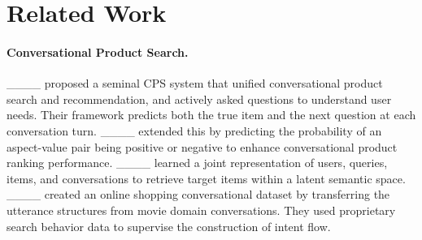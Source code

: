 \section{Related Work}
\label{sec:related_work}

\vspace{-0.5em}
\paragraph{Conversational Product Search.}

____ proposed a seminal CPS system that unified conversational product search and recommendation, and actively asked questions to understand user needs. 
Their framework predicts both the true item and the next question at each conversation turn. 
____ extended this by predicting the probability of an aspect-value pair being positive or negative to enhance conversational product ranking performance. 
____ learned a joint representation of users, queries, items, and conversations to retrieve target items within a latent semantic space. 
____ created an online shopping conversational dataset by transferring the utterance structures from movie domain conversations. They used proprietary search behavior data to supervise the construction of intent flow.%

